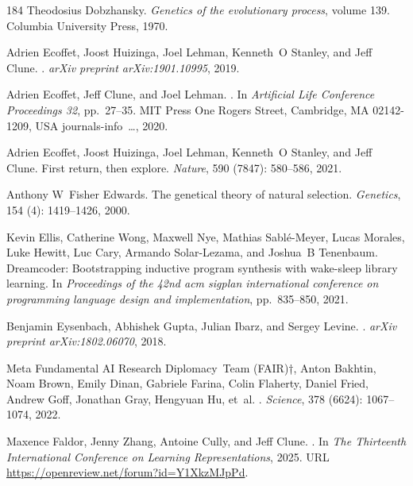 \begin{thebibliography}{184}
Theodosius Dobzhansky.
\newblock \emph{Genetics of the evolutionary process}, volume 139.
\newblock Columbia University Press, 1970.

Adrien Ecoffet, Joost Huizinga, Joel Lehman, Kenneth~O Stanley, and Jeff Clune.
.
\newblock \emph{arXiv preprint arXiv:1901.10995}, 2019.

Adrien Ecoffet, Jeff Clune, and Joel Lehman.
.
\newblock In \emph{Artificial Life Conference Proceedings 32}, pp.\  27--35.
  MIT Press One Rogers Street, Cambridge, MA 02142-1209, USA journals-info~…,
  2020.

Adrien Ecoffet, Joost Huizinga, Joel Lehman, Kenneth~O Stanley, and Jeff Clune.
\newblock First return, then explore.
\newblock \emph{Nature}, 590 (7847): 580--586, 2021.

Anthony W~Fisher Edwards.
\newblock The genetical theory of natural selection.
\newblock \emph{Genetics}, 154 (4): 1419--1426, 2000.

Kevin Ellis, Catherine Wong, Maxwell Nye, Mathias Sabl{\'e}-Meyer, Lucas
  Morales, Luke Hewitt, Luc Cary, Armando Solar-Lezama, and Joshua~B Tenenbaum.
\newblock Dreamcoder: Bootstrapping inductive program synthesis with wake-sleep
  library learning.
\newblock In \emph{Proceedings of the 42nd acm sigplan international conference
  on programming language design and implementation}, pp.\  835--850, 2021.

Benjamin Eysenbach, Abhishek Gupta, Julian Ibarz, and Sergey Levine.
.
\newblock \emph{arXiv preprint arXiv:1802.06070}, 2018.

Meta Fundamental AI Research Diplomacy~Team (FAIR)†, Anton Bakhtin, Noam
  Brown, Emily Dinan, Gabriele Farina, Colin Flaherty, Daniel Fried, Andrew
  Goff, Jonathan Gray, Hengyuan Hu, et~al.
.
\newblock \emph{Science}, 378 (6624): 1067--1074, 2022.

Maxence Faldor, Jenny Zhang, Antoine Cully, and Jeff Clune.
.
\newblock In \emph{The Thirteenth International Conference on Learning
  Representations}, 2025.
\newblock URL \url{https://openreview.net/forum?id=Y1XkzMJpPd}.


\end{thebibliography}
